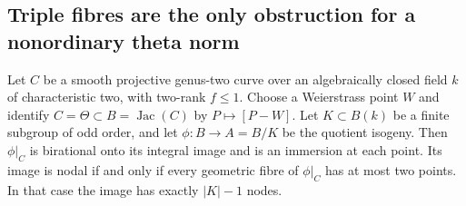 \subsection{Triple fibres are the only obstruction for a nonordinary theta norm}

\begin{lemma}
\label{lem:root-nonordinary-odd-theta-nodality}
Let $C$ be a smooth projective genus-two curve over an algebraically
closed field $k$ of characteristic two, with two-rank $f\leq1$.
Choose a Weierstrass point $W$ and identify
$C=\Theta\subset B=\operatorname{Jac}(C)$ by $P\mapsto[P-W]$.
Let $K\subset B(k)$ be a finite subgroup of odd order, and let
$\phi:B\to A=B/K$ be the quotient isogeny.
Then $\phi|_C$ is birational onto its integral image and is an
immersion at each point. Its image is nodal if and only if every
geometric fibre of $\phi|_C$ has at most two points. In that case
the image has exactly $|K|-1$ nodes.
\end{lemma}
